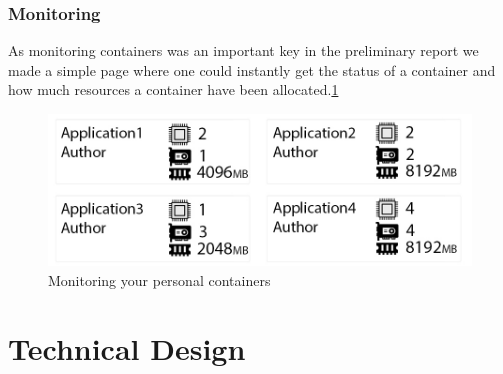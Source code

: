 \documentclass[../main.tex]{subfiles}
\begin{document}
\subsubsection*{Monitoring}
As monitoring containers was an important key in the preliminary report we made a simple page where one could instantly get the status of a container and how much resources a container have been allocated.\ref{fig:portal_monitoring.png}
\begin{figure}[H]
    \centering
    \includegraphics{img/frontend/monitoring_frontend.jpg}
    \caption{Monitoring your personal containers}
    \label{fig:portal_monitoring.png}
\end{figure}


\pagebreak\section{Technical Design}
\end{document}

